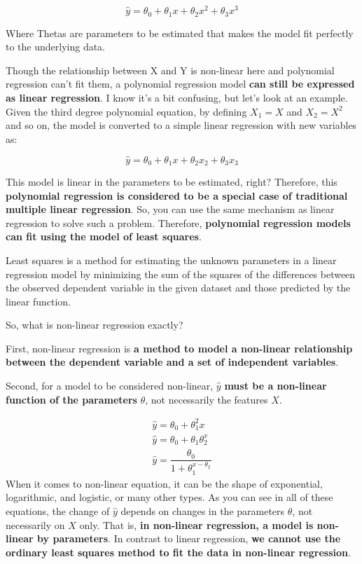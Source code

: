	\begin{equation}
	\hat{y} = \theta_{0} + \theta_{1}x + \theta_{2}x^{2} + \theta_{3}x^{3}
	\end{equation}
  
	
	Where Thetas are parameters to be estimated that makes the model fit perfectly to the underlying data. 
	
	Though the relationship between X and Y is non-linear here and polynomial regression can't fit them, a polynomial regression model \textbf{can still be expressed as linear regression}. I know it's a bit confusing, but let's look at an example. Given the third degree polynomial equation, by defining $X_{1}=X$ and $X_{2}= X^{2}$ and so on, the model is converted to a simple linear regression with new variables as:
	
	\begin{equation}
		\hat{y} = \theta_{0} + \theta_{1}x + \theta_{2}x_{2} + \theta_{3}x_{3}
	\end{equation}
	 
	This model is linear in the parameters to be estimated, right? Therefore, this \textbf{polynomial regression is considered to be a special case of traditional multiple linear regression}. So, you can use the same mechanism as linear regression to solve such a problem. Therefore, \textbf{polynomial regression models can fit using the model of least squares}. 
	
	Least squares is a method for estimating the unknown parameters in a linear regression model by minimizing the sum of the squares of the differences between the observed dependent variable in the given dataset and those predicted by the linear function. 
	
	So, what is non-linear regression exactly? 
	
	First, non-linear regression is \textbf{a method to model a non-linear relationship between the dependent variable and a set of independent variables}. 
	
	Second, for a model to be considered non-linear, $\hat{y}$ \textbf{must be a non-linear function of the parameters} $\theta$, not necessarily the features $X$. 
	
	\begin{equation}
		\begin{multlined}
		\hat{y} = \theta_{0}+\theta_{1}^{2}x \\
		\hat{y} = \theta_{0}+\theta_{1}\theta_{2}^{x} \\
		\hat{y} = \dfrac{\theta_{0}}{1+\theta_{1}^{x-\theta_{2}}}
		\end{multlined}
	\end{equation}
	When it comes to non-linear equation, it can be the shape of exponential, logarithmic, and logistic, or many other types. As you can see in all of these equations, the change of $\hat{y}$ depends on changes in the parameters $\theta$, not necessarily on $X$ only. 
	That is, \textbf{in non-linear regression, a model is non-linear by parameters}. In contrast to linear regression, \textbf{we cannot use the ordinary least squares method to fit the data in non-linear regression}. 
	
